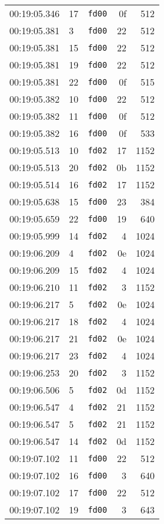 \documentclass{article}
\begin{document}
\begin{longtable}{lllrr}
00:19:05.346 & 17 & \texttt{fd00} & 0f & 512 \\
00:19:05.381 & 3 & \texttt{fd00} & 22 & 512 \\
00:19:05.381 & 15 & \texttt{fd00} & 22 & 512 \\
00:19:05.381 & 19 & \texttt{fd00} & 22 & 512 \\
00:19:05.381 & 22 & \texttt{fd00} & 0f & 515 \\
00:19:05.382 & 10 & \texttt{fd00} & 22 & 512 \\
00:19:05.382 & 11 & \texttt{fd00} & 0f & 512 \\
00:19:05.382 & 16 & \texttt{fd00} & 0f & 533 \\
00:19:05.513 & 10 & \texttt{fd02} & 17 & 1152 \\
00:19:05.513 & 20 & \texttt{fd02} & 0b & 1152 \\
00:19:05.514 & 16 & \texttt{fd02} & 17 & 1152 \\
00:19:05.638 & 15 & \texttt{fd00} & 23 & 384 \\
00:19:05.659 & 22 & \texttt{fd00} & 19 & 640 \\
00:19:05.999 & 14 & \texttt{fd02} & 4 & 1024 \\
00:19:06.209 & 4 & \texttt{fd02} & 0e & 1024 \\
00:19:06.209 & 15 & \texttt{fd02} & 4 & 1024 \\
00:19:06.210 & 11 & \texttt{fd02} & 3 & 1152 \\
00:19:06.217 & 5 & \texttt{fd02} & 0e & 1024 \\
00:19:06.217 & 18 & \texttt{fd02} & 4 & 1024 \\
00:19:06.217 & 21 & \texttt{fd02} & 0e & 1024 \\
00:19:06.217 & 23 & \texttt{fd02} & 4 & 1024 \\
00:19:06.253 & 20 & \texttt{fd02} & 3 & 1152 \\
00:19:06.506 & 5 & \texttt{fd02} & 0d & 1152 \\
00:19:06.547 & 4 & \texttt{fd02} & 21 & 1152 \\
00:19:06.547 & 5 & \texttt{fd02} & 21 & 1152 \\
00:19:06.547 & 14 & \texttt{fd02} & 0d & 1152 \\
00:19:07.102 & 11 & \texttt{fd00} & 22 & 512 \\
00:19:07.102 & 16 & \texttt{fd00} & 3 & 640 \\
00:19:07.102 & 17 & \texttt{fd00} & 22 & 512 \\
00:19:07.102 & 19 & \texttt{fd00} & 3 & 643 \\

\end{longtable}
\end{document}
